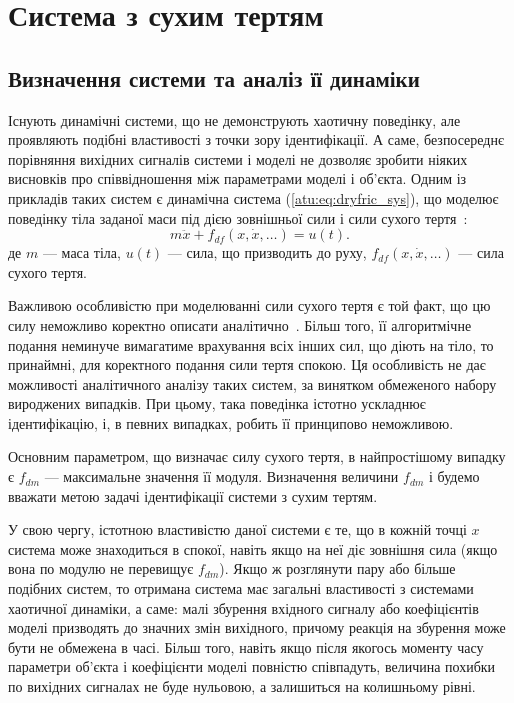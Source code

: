 
\FloatBarrier
\section{Система з сухим тертям} %
\label{atu:sect:fric}


\subsection{Визначення системи та аналіз її динаміки} %

Існують динамічні системи, що не демонструють хаотичну поведінку,
але проявляють подібні властивості з точки зору ідентифікації. А саме,
безпосереднє порівняння вихідних
сигналів системи і моделі не дозволяє зробити ніяких
висновків про співвідношення між параметрами моделі і об'єкта. Одним із
прикладів таких систем є динамічна система (\ref{atu:eq:dryfric_sys}), що
моделює поведінку тіла заданої маси під дією зовнішньої сили і сили
сухого тертя~\cite{berger_friction,osn_dyn_prom_robot,borcov}:
%
\begin{equation}
  m \ddot{x} + f_{df}( x, \dot{x}, \ldots)  = u(t).
\label{atu:eq:dryfric_sys}
\end{equation}
%
де
$m$ --- маса тіла,
$u(t)$ --- сила, що призводить до руху,
$f_{df}(x, \dot{x}, \ldots)$ ---  сила сухого тертя.

Важливою особливістю при моделюванні сили сухого тертя є той факт, що цю силу
неможливо коректно описати аналітично~\cite{atu_asau11}.
Більш того, її алгоритмічне подання неминуче вимагатиме
врахування всіх інших сил, що діють на тіло, то принаймні,
для коректного подання сили тертя спокою. Ця особливість не
дає можливості аналітичного аналізу таких систем, за винятком
обмеженого набору вироджених випадків. При цьому, така поведінка
істотно ускладнює ідентифікацію, і, в певних випадках, робить
її принципово неможливою.

Основним параметром, що визначає силу сухого тертя, в найпростішому
випадку є $f_{dm}$ --- максимальне значення її
модуля. Визначення величини  $f_{dm}$ і будемо вважати метою задачі ідентифікації
системи з сухим тертям.

У свою чергу, істотною властивістю даної системи є те, що в кожній
точці \(x\) система може знаходиться в спокої, навіть якщо на неї
діє зовнішня сила (якщо вона по модулю не перевищує $f_{dm}$).
Якщо ж розглянути пару або більше подібних систем, то
отримана система має загальні властивості з системами хаотичної
динаміки, а саме: малі збурення вхідного сигналу або коефіцієнтів
моделі призводять до значних змін вихідного, причому реакція на
збурення може бути не обмежена в часі. Більш того, навіть якщо
після якогось моменту часу параметри об'єкта і коефіцієнти
моделі повністю співпадуть, величина похибки по вихідних сигналах не
буде нульовою, а залишиться на колишньому рівні.

